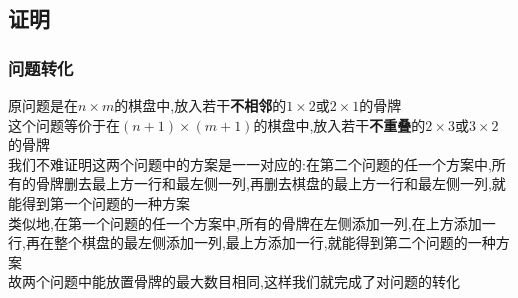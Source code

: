 \documentclass{beamer}
\begin{document}
		\subsection{证明}
			\begin{frame}\frametitle{问题转化}
				原问题是在$n\times m$的棋盘中,放入若干\textbf{不相邻}的$1\times2$或$2\times1$的骨牌\\
				这个问题等价于在$(n+1)\times(m+1)$的棋盘中,放入若干\textbf{不重叠}的$2\times3$或$3\times2$的骨牌\\
				我们不难证明这两个问题中的方案是一一对应的:在第二个问题的任一个方案中,所有的骨牌删去最上方一行和最左侧一列,再删去棋盘的最上方一行和最左侧一列,就能得到第一个问题的一种方案\\
				类似地,在第一个问题的任一个方案中,所有的骨牌在左侧添加一列,在上方添加一行,再在整个棋盘的最左侧添加一列,最上方添加一行,就能得到第二个问题的一种方案\\
				故两个问题中能放置骨牌的最大数目相同,这样我们就完成了对问题的转化
			\end{frame}
\end{document}
